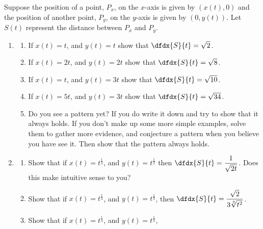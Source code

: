 \vskip-4mm{}



\begin{embeddedproblem}
    Suppose the position of a point, $P_x$, on the $x$-axis is given
    by $(x(t),0)$ and the position of another point, $P_y$, on the
    $y$-axis is given by $(0,y(t))$. Let $S(t)$ represent the distance
    between $P_x$ and $P_y$.
    \begin{enumerate}[label={\bf{}(\alph*)}]
    \item
      \begin{enumerate}[label={\bf{}\roman*.}]
      \item If $x(t)=t$, and $y(t)=t$ show that
        $\dfdx{S}{t}=\sqrt{2}$.
      \item If $x(t)=2t$, and $y(t)=2t$ show that
        $\dfdx{S}{t}=\sqrt{8}$.
      \item If $x(t)=t$, and $y(t)=3t$ show that
        $\dfdx{S}{t}=\sqrt{10}$.
      \item If $x(t)=5t$, and $y(t)=3t$ show that
        $\dfdx{S}{t}=\sqrt{34}$.
      \item Do you see a pattern yet? If you do write it down and try
        to show that it always holds. If you don't make up some more
        simple examples, solve them to gather more evidence, and
        conjecture a pattern when you believe you have see it. Then show
        that the pattern always holds.
      \end{enumerate}
    \item
      \begin{enumerate}[label={\bf{}\roman*.}]
      \item Show that if $x(t)=t^{\frac12}$, and $y(t)=t^{\frac12}$
        then $\displaystyle\dfdx{S}{t}=\frac{1}{\sqrt{2t}}$. Does this
        make intuitive sense to you?
      \item Show that if $x(t)=t^{\frac13}$, and $y(t)=t^{\frac13}$,
        then
        $\displaystyle\dfdx{S}{t}=\frac{\sqrt{2}}{3\sqrt[3]{t^2}}$.
      \item Show that if $x(t)=t^{\frac14}$, and $y(t)=t^{\frac14}$,

\end{enumerate}
\end{enumerate}
\end{embeddedproblem}
